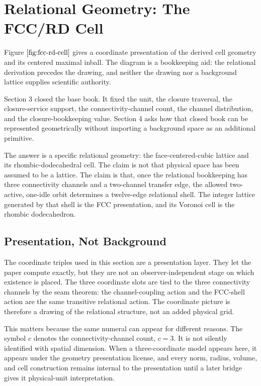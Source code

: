 \section{Relational Geometry: The FCC/RD Cell}
\label{sec:04}
Figure \(\ref{fig:fcc-rd-cell}\) gives a coordinate presentation of the derived cell geometry and its centered maximal inball.  The diagram is a bookkeeping aid: the relational derivation precedes the drawing, and neither the drawing nor a background lattice supplies scientific authority.

Section 3 closed the base book. It fixed the unit, the closure traversal, the closure-service support, the connectivity-channel count, the channel distribution, and the closure-bookkeeping value. Section 4 asks how that closed book can be represented geometrically without importing a background space as an additional primitive.

The answer is a specific relational geometry: the face-centered-cubic lattice and its rhombic-dodecahedral cell. The claim is not that physical space has been assumed to be a lattice. The claim is that, once the relational bookkeeping has three connectivity channels and a two-channel transfer edge, the allowed two-active, one-idle orbit determines a twelve-edge relational shell. The integer lattice generated by that shell is the FCC presentation, and its Voronoi cell is the rhombic dodecahedron.

\subsection{Presentation, Not Background}
The coordinate triples used in this section are a presentation layer. They let the paper compute exactly, but they are not an observer-independent stage on which existence is placed. The three coordinate slots are tied to the three connectivity channels by the seam theorem: the channel-coupling action and the FCC-shell action are the same transitive relational action. The coordinate picture is therefore a drawing of the relational structure, not an added physical grid.

This matters because the same numeral can appear for different reasons. The symbol \(c\) denotes the connectivity-channel count, \(c=3\). It is not silently identified with spatial dimension. When a three-coordinate model appears here, it appears under the geometry presentation license, and every norm, radius, volume, and cell construction remains internal to the presentation until a later bridge gives it physical-unit interpretation.

